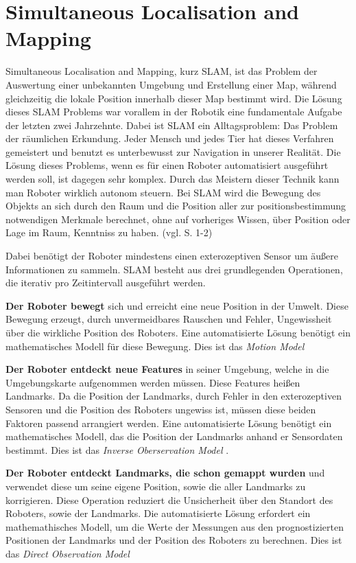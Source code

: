 \chapter{Simultaneous Localisation and Mapping}

Simultaneous Localisation and Mapping, kurz SLAM, ist das Problem der Auswertung einer unbekannten Umgebung und Erstellung einer Map, während gleichzeitig die lokale Position innerhalb dieser Map bestimmt wird. Die Lösung dieses SLAM Problems war vorallem in der Robotik eine fundamentale Aufgabe der letzten zwei Jahrzehnte. Dabei ist SLAM ein Alltagsproblem: Das Problem der räumlichen Erkundung. Jeder Mensch und jedes Tier hat dieses Verfahren gemeistert und benutzt es unterbewusst zur Navigation in unserer Realität. Die Lösung dieses Problems, wenn es für einen Roboter automatisiert ausgeführt werden soll, ist dagegen sehr komplex. Durch das Meistern dieser Technik kann man Roboter wirklich autonom steuern. 
Bei SLAM wird die Bewegung des Objekts an sich durch den Raum und die Position aller zur positionsbestimmung notwendigen Merkmale berechnet, ohne auf vorheriges Wissen, über Position oder Lage im Raum, Kenntniss zu haben. (vgl. \cite{slam} S. 1-2) 

Dabei benötigt der Roboter mindestens einen exterozeptiven Sensor um äußere Informationen zu sammeln.
SLAM besteht aus drei grundlegenden Operationen, die iterativ pro Zeitintervall ausgeführt werden.

\textbf{Der Roboter bewegt} sich und erreicht eine neue Position in der Umwelt. Diese Bewegung erzeugt, durch unvermeidbares Rauschen und Fehler, Ungewissheit über die wirkliche Position des Roboters. Eine automatisierte Lösung benötigt ein mathematisches Modell für diese Bewegung. Dies ist das \glqq\textit{Motion Model}\grqq

\textbf{Der Roboter entdeckt neue Features} in seiner Umgebung, welche in die Umgebungskarte aufgenommen werden müssen. Diese Features heißen \glqq Landmarks\grqq . Da die Position der Landmarks, durch Fehler in den exterozeptiven Sensoren und die Position des Roboters ungewiss ist, müssen diese beiden Faktoren passend arrangiert werden. Eine automatisierte Lösung benötigt ein mathematisches Modell, das die Position der Landmarks anhand er Sensordaten bestimmt. Dies ist das \glqq \textit{Inverse Oberservation Model} \grqq .

\textbf{Der Roboter entdeckt Landmarks, die schon gemappt wurden} und verwendet diese um seine eigene Position, sowie die aller Landmarks zu korrigieren. Diese Operation reduziert die Unsicherheit über den Standort des Roboters, sowie der Landmarks. Die automatisierte Lösung erfordert ein mathemathisches Modell, um die Werte der Messungen aus den prognostizierten Positionen der Landmarks und der Position des Roboters zu berechnen. Dies ist das \glqq \textit{Direct Observation Model} \grqq

